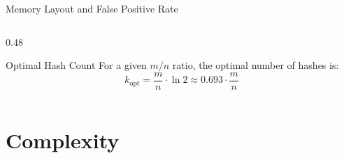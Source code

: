 \documentclass[aspectratio=169, 10pt]{beamer}
\begin{document}
\begin{frame}{Memory Layout and False Positive Rate}
\begin{columns}[T]
\begin{column}{0.48\textwidth}
\vspace{0.3em}
\begin{alertblock}{Optimal Hash Count}
For a given $m/n$ ratio, the optimal number of hashes is:
\[
  k_{\text{opt}} = \frac{m}{n} \cdot \ln 2 \approx 0.693 \cdot \frac{m}{n}
\]
\end{alertblock}
\end{column}
\end{columns}
\end{frame}

\section{Complexity}
\end{document}
